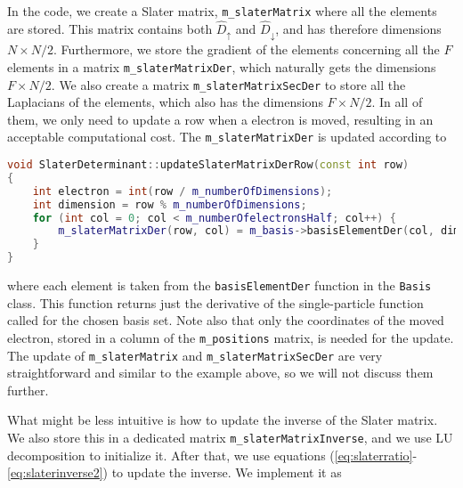 In the code, we create a Slater matrix, \lstinline{m_slaterMatrix} where all the elements are stored. This matrix contains both $\hat{D}_{\uparrow}$ and $\hat{D}_{\downarrow}$, and has therefore dimensions $N\times N/2$. Furthermore, we store the gradient of the elements concerning all the $F$ elements in a matrix \lstinline{m_slaterMatrixDer}, which naturally gets the dimensions $F\times N/2$. We also create a matrix \lstinline{m_slaterMatrixSecDer} to store all the Laplacians of the elements, which also has the dimensions $F\times N/2$. In all of them, we only need to update a row when a electron is moved, resulting in an acceptable computational cost. The \lstinline{m_slaterMatrixDer} is updated according to

\begin{lstlisting}[language={c++}]
void SlaterDeterminant::updateSlaterMatrixDerRow(const int row)
{
	int electron = int(row / m_numberOfDimensions);
	int dimension = row % m_numberOfDimensions;
	for (int col = 0; col < m_numberOfelectronsHalf; col++) {
		m_slaterMatrixDer(row, col) = m_basis->basisElementDer(col, dimension, m_positions.col(electron));
	}
}
\end{lstlisting}
where each element is taken from the \lstinline{basisElementDer} function in the \lstinline{Basis} class. This function returns just the derivative of the single-particle function called for the chosen basis set. Note also that only the coordinates of the moved electron, stored in a column of the \lstinline{m_positions} matrix, is needed for the update. The update of \lstinline{m_slaterMatrix} and \lstinline{m_slaterMatrixSecDer} are very straightforward and similar to the example above, so we will not discuss them further.

What might be less intuitive is how to update the inverse of the Slater matrix. We also store this in a dedicated matrix \lstinline{m_slaterMatrixInverse}, and we use LU decomposition to initialize it. After that, we use equations (\ref{eq:slaterratio}-\ref{eq:slaterinverse2}) to update the inverse. We implement it as

